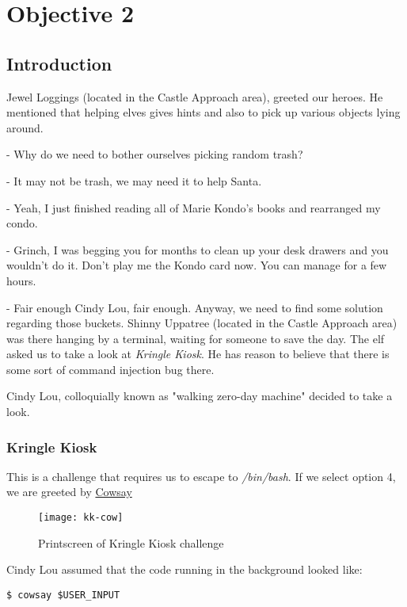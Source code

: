 \chapter{Objective 2}

\section{Introduction}

{\color{codegreen}Jewel Loggings} (located in the Castle Approach area), greeted our heroes. He mentioned that helping elves gives hints
and also to pick up various objects lying around.

- Why do we need to bother ourselves picking random trash?

- It may not be trash, we may need it to help Santa.

- Yeah, I just finished reading all of Marie Kondo's books and rearranged my condo.

- Grinch, I was begging you for months to clean up your desk drawers and you wouldn't do it. Don't play me the Kondo card now.
You can manage for a few hours.

- Fair enough Cindy Lou, fair enough. Anyway, we need to find some solution regarding those buckets.
\newline
{\color{codegreen}Shinny Uppatree} (located in the Castle Approach area) was there hanging by a terminal, waiting for someone to save the day.
The elf asked us to take a look at \textit{Kringle Kiosk}. He has reason to believe that there is some sort of command injection bug there.

Cindy Lou, colloquially known as "walking zero-day machine" decided to take a look.

\subsection{Kringle Kiosk}
This is a challenge that requires us to escape to \textit{/bin/bash}.
If we select option 4, we are greeted by \href{https://en.wikipedia.org/wiki/Cowsay}{Cowsay}
\begin{figure}[h!]
  \texttt{[image: kk-cow]}
  \caption{Printscreen of Kringle Kiosk challenge}
\end{figure}

\newpage
Cindy Lou assumed that the code running in the background looked like:

\begin{verbatim}
$ cowsay $USER_INPUT
\end{verbatim}

